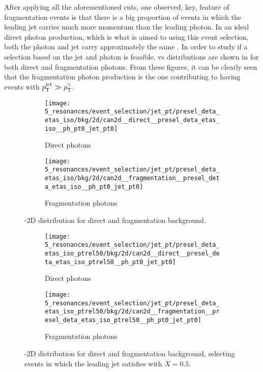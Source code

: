 After applying all the aforementioned cuts, one observed, key, feature of fragmentation events is that there is a big proportion of events in which the leading jet carries much more momentum than the leading photon. In an ideal direct photon production, which is what is aimed to using this event selection, both the photon and jet carry approximately the same \pt. In order to study if a selection based on the jet and photon \pt is feasible, \ptgam vs \ptjet distributions are shown in \Fig{\ref{fig:evt_selection:sr_opt:jet_pt:ptgam_ptjet}} for both direct and fragmentation photons. From these figures, it can be clearly seen that the fragmentation photon production is the one contributing to having events with \(p_{\text{T}}^\text{jet} \gg p_{\text{T}}^{\gamma}\).


\begin{figure}[ht!]
    \centering
    \begin{subfigure}[h]{0.49\linewidth}
        \centering
        \texttt{[image: 5\_resonances/event\_selection/jet\_pt/presel\_deta\_etas\_iso/bkg/2d/can2d\_\_direct\_\_presel\_deta\_etas\_iso\_\_ph\_pt0\_jet\_pt0]}
        \caption{Direct photons}
    \end{subfigure}
    \hfill
    \begin{subfigure}[h]{0.49\linewidth}
        \centering
        \texttt{[image: 5\_resonances/event\_selection/jet\_pt/presel\_deta\_etas\_iso/bkg/2d/can2d\_\_fragmentation\_\_presel\_deta\_etas\_iso\_\_ph\_pt0\_jet\_pt0]}
        \caption{Fragmentation photons}
    \end{subfigure}
    \caption{\ptgam-\ptjet 2D distribution for direct and fragmentation \pythia \gammajet background.}
    \label{fig:evt_selection:sr_opt:jet_pt:ptgam_ptjet}
\end{figure}

\begin{figure}[ht!]
    \centering
    \begin{subfigure}[h]{0.49\linewidth}
        \centering
        \texttt{[image: 5\_resonances/event\_selection/jet\_pt/presel\_deta\_etas\_iso\_ptrel50/bkg/2d/can2d\_\_direct\_\_presel\_deta\_etas\_iso\_ptrel50\_\_ph\_pt0\_jet\_pt0]}
        \caption{Direct photons}
    \end{subfigure}
    \hfill
    \begin{subfigure}[h]{0.49\linewidth}
        \centering
        \texttt{[image: 5\_resonances/event\_selection/jet\_pt/presel\_deta\_etas\_iso\_ptrel50/bkg/2d/can2d\_\_fragmentation\_\_presel\_deta\_etas\_iso\_ptrel50\_\_ph\_pt0\_jet\_pt0]}
        \caption{Fragmentation photons}
    \end{subfigure}
    \caption{\ptgam-\ptjet 2D distribution for direct and fragmentation \pythia \gammajet background, selecting events in which the leading jet \pt satisfies \Eqn{\ref{eq:evt_selection:sr_opt:jet_pt:jet_pt_rel_X}} with \(X=0.5\).}
    \label{fig:evt_selection:sr_opt:jet_pt:ptgam_ptjet_X0.5}
\end{figure}



